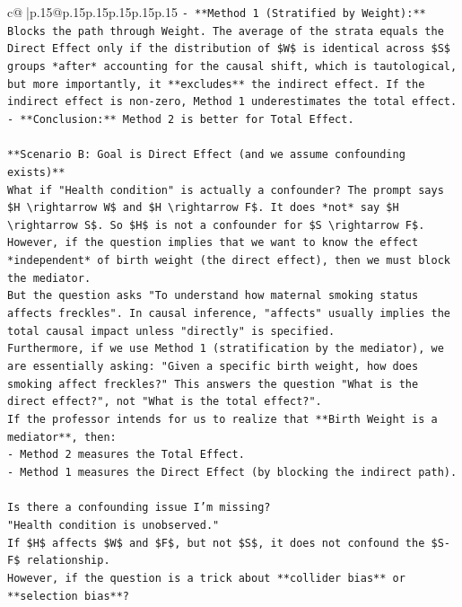 \documentclass{article}
\begin{document}
{\begin{supertabular}{c@{$\;$}|p{.15\linewidth}@{}p{.15\linewidth}p{.15\linewidth}p{.15\linewidth}p{.15\linewidth}p{.15\linewidth}}
{{{\texttt{{-}   **Method 1 (Stratified by Weight):** Blocks the path through Weight. The average of the strata equals the Direct Effect only if the distribution of \$W\$ is identical across \$S\$ groups *after* accounting for the causal shift, which is tautological, but more importantly, it **excludes** the indirect effect. If the indirect effect is non{-}zero, Method 1 underestimates the total effect.} \\
\texttt{{-}   **Conclusion:** Method 2 is better for Total Effect.} \\
\\ 
\texttt{**Scenario B: Goal is Direct Effect (and we assume confounding exists)**} \\
\texttt{What if "Health condition" is actually a confounder? The prompt says \$H \textbackslash{}rightarrow W\$ and \$H \textbackslash{}rightarrow F\$. It does *not* say \$H \textbackslash{}rightarrow S\$. So \$H\$ is not a confounder for \$S \textbackslash{}rightarrow F\$.} \\
\texttt{However, if the question implies that we want to know the effect *independent* of birth weight (the direct effect), then we must block the mediator.} \\
\texttt{But the question asks "To understand how maternal smoking status affects freckles". In causal inference, "affects" usually implies the total causal impact unless "directly" is specified.} \\
\texttt{Furthermore, if we use Method 1 (stratification by the mediator), we are essentially asking: "Given a specific birth weight, how does smoking affect freckles?" This answers the question "What is the direct effect?", not "What is the total effect?".} \\
\texttt{If the professor intends for us to realize that **Birth Weight is a mediator**, then:} \\
\texttt{{-}   Method 2 measures the Total Effect.} \\
\texttt{{-}   Method 1 measures the Direct Effect (by blocking the indirect path).} \\
\\ 
\texttt{Is there a confounding issue I'm missing?} \\
\texttt{"Health condition is unobserved."} \\
\texttt{If \$H\$ affects \$W\$ and \$F\$, but not \$S\$, it does not confound the \$S{-}F\$ relationship.} \\
\texttt{However, if the question is a trick about **collider bias** or **selection bias**?} \\
}}}
\end{supertabular}}
\end{document}
